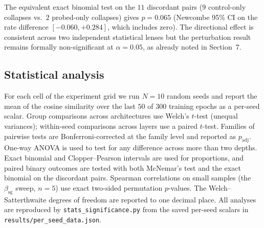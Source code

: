 The equivalent exact binomial test on the $11$ discordant pairs
($9$ control-only collapses vs.\ $2$ probed-only collapses) gives
$p = 0.065$ (Newcombe 95\% CI on the rate difference $[-0.060, +0.284]$,
which includes zero). The directional effect is consistent across two
independent statistical lenses but the perturbation result remains
formally non-significant at $\alpha = 0.05$, as already noted in
Section~7.



\subsection{Statistical analysis}
\label{sec:stats}
For each cell of the experiment grid we run $N = 10$ random seeds and
report the mean of the cosine similarity over the last $50$ of $300$
training epochs as a per-seed scalar. Group comparisons across
architectures use Welch's $t$-test (unequal variances); within-seed
comparisons across layers use a paired $t$-test. Families of pairwise
tests are Bonferroni-corrected at the family level and reported as
$p_{\mathrm{adj}}$. One-way ANOVA is used to test for any difference
across more than two depths. Exact binomial and Clopper--Pearson
intervals are used for proportions, and paired binary outcomes are
tested with both McNemar's test and the exact binomial on the
discordant pairs. Spearman correlations on small samples (the
$\beta_{\mathrm{sg}}$ sweep, $n = 5$) use exact two-sided permutation
$p$-values. The Welch--Satterthwaite degrees of freedom are reported
to one decimal place. All analyses are reproduced by
\texttt{stats\_significance.py} from the saved per-seed scalars in
\texttt{results/per\_seed\_data.json}.
